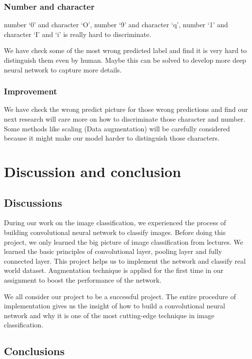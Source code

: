 \documentclass[twoside,twocolumn,10.8pt]{article}
\begin{document}
\subsubsection{Number and character}

number ‘0’ and character ‘O’, number ‘9’ and character ‘q’, number ‘1’ and character ‘I’ and ‘i’ is really hard to discriminate.

\noindent We have check some of the most wrong predicted label and find it is very hard to distinguish them even by human. Maybe this can be solved to develop more deep neural network to capture more details.

\subsubsection{Improvement}

We have check the wrong predict picture for those wrong predictions and find our next research will care more on how to discriminate those character and number. Some methods like scaling (Data augmentation) will be carefully considered because it might make our model harder to distinguish those characters.


\section{Discussion and conclusion}
\subsection{Discussions}

During our work on the image classification, we experienced the process of building convolutional neural network to classify images. Before doing this project, we only learned the big picture of image classification from lectures. We learned the basic principles of convolutional layer, pooling layer and fully connected layer. This project helps us to implement the network and classify real world dataset. Augmentation technique is applied for the first time in our assignment to boost the performance of the network.

\noindent We all consider our project to be a successful project. The entire procedure of implementation gives us the insight of how to build a convolutional neural network and why it is one of the most cutting-edge technique in image classification.

\subsection{Conclusions}
\end{document}
